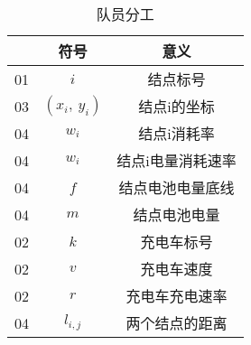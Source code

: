 \begin{table}[h]
	\begin{center}
		\caption{队员分工}
		\begin{tabular}{l|cc}
			\toprule[2pt] 
			   &  符号 & 意义 \\ \hline
			01& $i$& 结点标号\\
			03& $(x_i,~y_i)$&结点i的坐标\\
			04& $w_i$&结点i消耗率\\
			04& $w_i$&结点i电量消耗速率\\
			04& $f$&结点电池电量底线\\
			04& $m$&结点电池电量\\

			02& $k$&充电车标号\\
			02& $v$&充电车速度\\
			02& $r$&充电车充电速率\\
			
			04& $l_{i,j}$&两个结点的距离\\
			\toprule[2pt] 
		\end{tabular}
		
		\label{tab:distribution}
		\vspace{-0.4cm}
	\end{center}
\end{table}